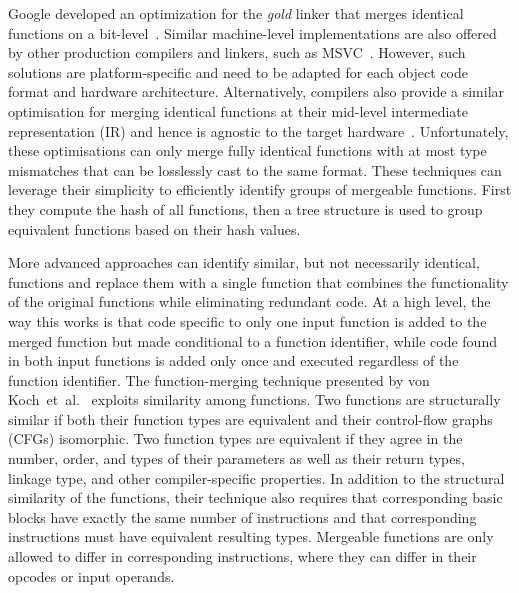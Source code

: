 Google developed an optimization for the \textit{gold} linker that merges
identical functions on a bit-level~\cite{tallam10,kwan12}. 
Similar machine-level implementations are also offered by other production compilers
and linkers, such as MSVC~\cite{msvc-icf}.
However, such solutions are platform-specific and need to be adapted for each object code format and hardware architecture.
Alternatively, compilers also provide a similar optimisation for merging identical functions at their mid-level intermediate representation (IR) and hence is agnostic to the target hardware~\cite{llvm-fm,livska14}.
Unfortunately, these optimisations can only merge fully identical functions with at most type mismatches that can be losslessly cast to the same format.
These techniques can leverage their simplicity to efficiently identify groups of mergeable functions.
First they compute the hash of all functions, then a tree structure is used to group equivalent functions based on their hash values.

More advanced approaches can identify similar, but not necessarily identical, functions and replace them with a single function that combines the functionality of the original functions while eliminating redundant code.
At a high level, the way this works is that code specific to only one input function is added to the merged function but made conditional to a function identifier, while code found in both input functions is added only once and executed regardless of the function identifier.
The function-merging technique presented by von Koch~et~al.~\cite{edler14} exploits similarity among functions.
Two functions are structurally similar if both their function types are equivalent
and their control-flow graphs (CFGs) isomorphic.
Two function types are equivalent if they agree in the number, order, and types
of their parameters as well as
their return types, linkage type, and other compiler-specific properties.
In addition to the structural similarity of the functions, their technique also
requires that corresponding basic blocks have exactly the same number of instructions
and that corresponding instructions must have equivalent resulting types.
Mergeable functions are only allowed to differ in corresponding instructions,
where they can differ in their opcodes or input operands.

